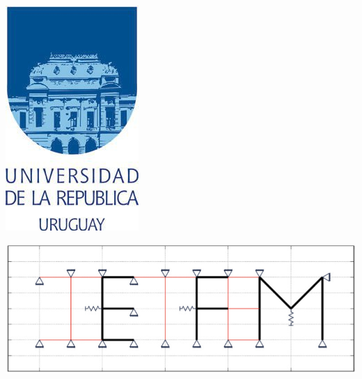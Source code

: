 \documentclass[a4paper,11pt]{article}
\begin{document}
\begin{minipage}[t]{.1\textwidth}      
\vspace{0.0mm}      
\includegraphics[width=.95\textwidth]{../../../../../../sources/Figs/logo_udelar}      
\end{minipage}      

\vspace{1cm}       

\hspace{1.5cm}       
\begin{center}       
\includegraphics[width=.95\textwidth]{../../../../../../sources/Figs/logo_ietfem}      
\end{center}       
\vspace{0.5cm}       
\end{document}
